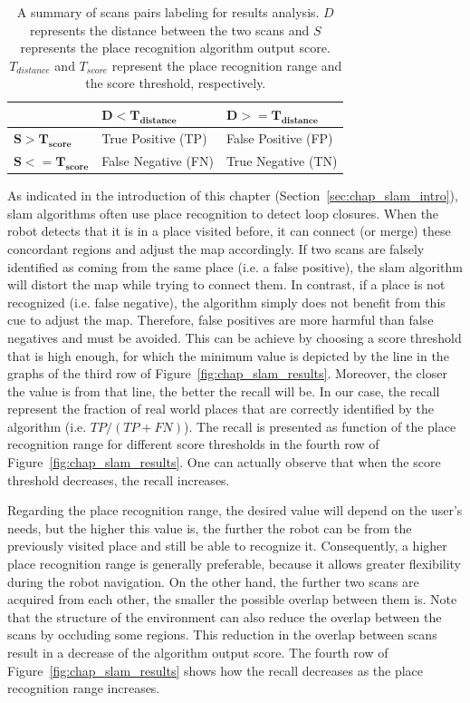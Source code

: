 \begin{table}[H]
    \centering
    \begin{tabular}{@{}l|ll@{}}
        \toprule
                                  & $\mathbf{D < T_{distance}}$ & $\mathbf{D >= T_{distance}}$ \\
        \hline
        $\mathbf{S > T_{score}}$  & True Positive (TP)          & False Positive (FP) \\
        $\mathbf{S <= T_{score}}$ & False Negative (FN)         & True Negative (TN) \\
        \bottomrule
    \end{tabular}
    \caption[Summary of scans pairs labeling for results analysis.]{A summary of scans pairs labeling for results analysis. $D$ represents the distance between the two scans and $S$ represents the place recognition algorithm output score. $T_{distance}$ and $T_{score}$ represent the place recognition range and the score threshold, respectively.}
    \label{tab:chap_slam_results_labeling}
\end{table}

As indicated in the introduction of this chapter (Section~\ref{sec:chap_slam_intro}), \gls*{slam} algorithms often use place recognition to detect loop closures. When the robot detects that it is in a place visited before, it can connect (or merge) these concordant regions and adjust the map accordingly. If two scans are falsely identified as coming from the same place (i.e. a false positive), the \gls*{slam} algorithm will distort the map while trying to connect them. In contrast, if a place is not recognized (i.e. false negative), the algorithm simply does not benefit from this cue to adjust the map. Therefore, false positives are more harmful than false negatives and must be avoided. This can be achieve by choosing a score threshold that is high enough, for which the minimum value is depicted by the line in the graphs of the third row of Figure~\ref{fig:chap_slam_results}. Moreover, the closer the value is from that line, the better the recall will be. In our case, the recall represent the fraction of real world places that are correctly identified by the algorithm (i.e. $TP/(TP+FN)$). The recall is presented as function of the place recognition range for different score thresholds in the fourth row of Figure~\ref{fig:chap_slam_results}. One can actually observe that when the score threshold decreases, the recall increases.

Regarding the place recognition range, the desired value will depend on the user's needs, but the higher this value is, the further the robot can be from the previously visited place and still be able to recognize it. Consequently, a higher place recognition range is generally preferable, because it allows greater flexibility during the robot navigation. On the other hand, the further two scans are acquired from each other, the smaller the possible overlap between them is. Note that the structure of the environment can also reduce the overlap between the scans by occluding some regions. This reduction in the overlap between scans result in a decrease of the algorithm output score. The fourth row of Figure~\ref{fig:chap_slam_results} shows how the recall decreases as the place recognition range increases.

